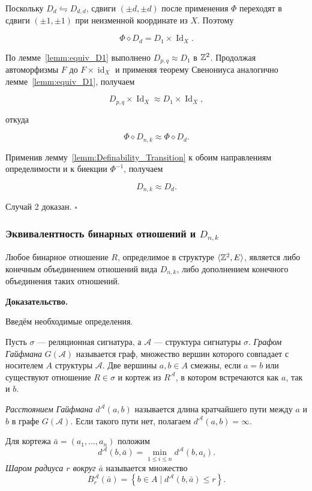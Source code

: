 Поскольку $D_d\leftrightharpoons D_{d,d}$, сдвиги $(\pm d,\pm d)$ после применения $\Phi$ переходят в сдвиги $(\pm1,\pm1)$ при неизменной координате из $X$. Поэтому

$$\Phi\diamond D_d=D_1\times\operatorname{Id}_X.$$

По лемме~\ref{lemm:equiv_D1} выполнено $D_{p,q}\approx D_1$ в $\mathbb{Z}^2$. Продолжая автоморфизмы $F$ до $F\times\operatorname{id}_X$ и применяя теорему Свенониуса аналогично лемме~\ref{lemm:equiv_D1}, получаем

$$D_{p,q}\times\operatorname{Id}_X\approx D_1\times\operatorname{Id}_X,$$

откуда

$$\Phi\diamond D_{n,k}\approx\Phi\diamond D_d.$$

Применив лемму~\ref{lemm:Definability_Transition} к обоим направлениям определимости и к биекции $\Phi^{-1}$, получаем

$$D_{n,k}\approx D_d.$$

Случай 2 доказан. \hfill $\square$

\subsubsection{Эквивалентность бинарных отношений и $D_{n,k}$}

\begin{theorem}
    \label{theorem:BinToDnk}
    Любое бинарное отношение $R$, определимое в структуре
    $\langle\mathbb{Z}^2,E\rangle$, является либо конечным объединением отношений
    вида $D_{n,k}$, либо дополнением конечного объединения таких отношений.
\end{theorem}

\textbf{Доказательство.} 

Введём необходимые определения.

\begin{definition}
    Пусть $\sigma$ --- реляционная сигнатура, а $\mathcal A$ --- структура
    сигнатуры $\sigma$. \textit{Графом Гайфмана} $G(\mathcal A)$ называется
    граф, множество вершин которого совпадает с носителем $A$ структуры
    $\mathcal A$. Две вершины $a,b\in A$ смежны, если $a=b$ или существуют
    отношение $R\in\sigma$ и кортеж из $R^{\mathcal A}$, в котором встречаются
    как $a$, так и $b$.
\end{definition}

\begin{definition}
    \textit{Расстоянием Гайфмана} $d^{\mathcal A}(a,b)$ называется длина
    кратчайшего пути между $a$ и $b$ в графе $G(\mathcal A)$. Если такого пути
    нет, полагаем $d^{\mathcal A}(a,b)=\infty$.

    Для кортежа $\bar a=(a_1,\ldots,a_n)$ положим
    $$
        d^{\mathcal A}(b,\bar a)
        =\min_{1\le i\le n}d^{\mathcal A}(b,a_i).
    $$
    \textit{Шаром радиуса $r$ вокруг $\bar a$} называется множество
    $$
        B_r^{\mathcal A}(\bar a)
        =\left\{b\in A\mid d^{\mathcal A}(b,\bar a)\le r\right\}.
    $$
\end{definition}

